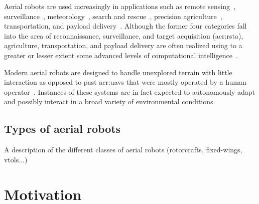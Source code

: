 Aerial robots are used increasingly in applications such as remote sensing~\citep{noor2018remote,tang2015drone,milas2018drones}, surveillance~\citep{paucar2018use,burkle2009collaborating}, meteorology~\citep{schuyler2019using}, search and rescue~\citep{pensieri2020drones,karaca2018potential,cui2015drones,seguin2018unmanned}, precision agriculture~\citep{daponte2019review,puri2017agriculture}, transportation, and payload delivery~\citep{kellermann2020drones}. Although the former four categories fall into the area of reconnaissance, surveillance, and target acquisition (\Gls{acr:rsta}), agriculture, transportation, and payload delivery are often realized using to a greater or lesser extent some advanced levels of computational intelligence~\citep{siciliano2016springer}. 

Modern aerial robots are designed to handle unexplored terrain with little interaction as opposed to past \Gls{acr:uav}s that were mostly operated by a human operator~\citep{siciliano2016springer}. Instances of these systems are in fact expected to autonomously adapt and possibly interact in a broad variety of environmental conditions.


\subsection{Types of aerial robots}

{\color{red}A description of the different classes of aerial robots (rotorcrafts, fixed-wings, vtols...)}

\section{Motivation}

